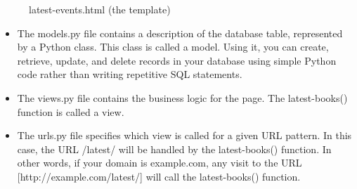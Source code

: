 \documentclass[12pt,a4paper,class,twoside,openany]{report}
\begin{document}
\begin{figure}
\begin{center}
\caption{latest-events.html (the template)}
\label{fg:3-8}
\end{center}
\end{figure}

\begin{itemize}
\item The models.py file contains a description of the database table, represented by a Python class. This class is called a model. Using it, you can create, retrieve, update, and delete records in your database using simple Python code rather than writing repetitive SQL statements.

 \item The views.py file contains the business logic for the page. The latest-books() function is called a view.
\item The urls.py file specifies which view is called for a given URL pattern. In this case, the
URL /latest/ will be handled by the latest-books() function. In other words, if your domain is example.com, any visit to the URL [http://example.com/latest/] will call the
latest-books() function.
\end{itemize}
\end{document}
